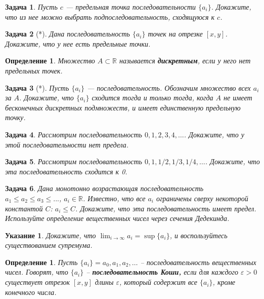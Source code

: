 \documentclass[12pt]{book}
\renewcommand{\epsilon}{\varepsilon}
\def\R{{\mathbb R}}
\theoremstyle{upshape}
\newtheorem{zadacha}{Задача}[chapter]
\theoremstyle{generic}
\newtheorem{opredelenie}[teorema]{Определение}
\theoremstyle{upshapenonumber}
\newtheorem{ukazanie}{Указание}[section]
\newcommand{\следствие}{%
     \refstepcounter{teorema}
     {\noindent\bf Следствие \thechapter.\arabic{teorema}:\ }}
\newcommand{\пример}{%
     \refstepcounter{teorema}
     {\noindent\bf Пример \thechapter.\arabic{teorema}:\ }}
\newcommand{\лемма}{%
     \refstepcounter{teorema}
     {\noindent\bf Лемма \thechapter.\arabic{teorema}:\ }}
\newcommand{\теорема}{%
     \refstepcounter{teorema}
     {\noindent\bf Теорема \thechapter.\arabic{teorema}:\ }}
\newcommand{\утверждение}{%
     \refstepcounter{teorema}
     {\noindent\bf Утверждение \thechapter.\arabic{teorema}:\ }}
\begin{document}
\begin{zadacha} Пусть $c$ --- предельная точка последовательности
$\{a_i\}$. Докажите, что из нее можно выбрать подпоследовательность,
сходящуюся к $c$.
\end{zadacha}

\begin{zadacha}[*] Дана последовательность $\{a_i\}$ точек на
отрезке $[x,y]$. Докажите, что у нее есть предельные точки.
\end{zadacha}

\begin{opredelenie} Множество $A\subset \R$ называется {\bf
дискретным}, если у него нет предельных точек.
\end{opredelenie}

\begin{zadacha}[*] Пусть $\{a_i\}$ --- последовательность. Обозначим
множество всех $a_i$ за $A$.  Докажите, что $\{a_i\}$ сходится тогда
и только тогда, когда $A$ не имеет бесконечных дискретных
подмножеств, и имеет единственную предельную точку.
\end{zadacha}

\begin{zadacha} Рассмотрим последовательность $0, 1, 2, 3, 4,
\ldots$. Докажите, что у этой последовательности нет предела.
\end{zadacha}

\begin{zadacha} Рассмотрим последовательность $0, 1, 1/2, 1/3, 1/4,
\ldots$. Докажите, что эта последовательность сходится к 0.
\end{zadacha}

\begin{zadacha} Дана монотонно возрастающая последовательность 
$a_1\leq a_2 \leq a_3 \leq ...$, $a_i\in \R$. Известно, что все
$a_i$ ограничены сверху некоторой константой $C$: $a_i \leq
C$. Докажите, что эта последовательность имеет предел. Используйте
определение вещественных чисел через сечения Дедекинда.
\end{zadacha}

\begin{ukazanie} Докажите, что $\lim_{i \to \infty} a_i  = \sup\{a_i\}$,
и воспользуйтесь существованием супремума.
\end{ukazanie}

\begin{opredelenie} Пусть $\{a_i\}= a_0, a_1, a_2, \ldots$ --
последовательность вещественных чисел. Говорят, что $\{a_i\}$ --
{\bf последовательность Коши,} если для каждого $\epsilon >0$
существует отрезок $[x, y]$ длины $\epsilon$, который содержит все
$\{a_i\}$, кроме конечного числа.
\end{opredelenie}
\end{document}
